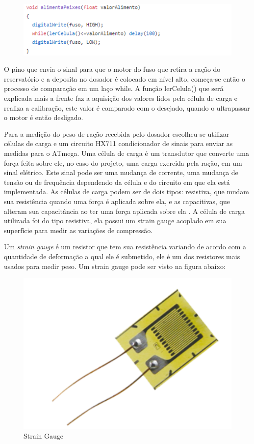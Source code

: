 \begin{figure}[!h]
\centering \includegraphics[scale=0.6]{figuras/controle2_codigo}
\label{codigo_controle2}
 \end{figure}

O pino que envia o sinal para que o motor do fuso que retira a ração do reservatório e a deposita no dosador é colocado em nível alto, começa-se então o processo de comparação  em um laço while. A função lerCelula() que será explicada mais a frente faz a aquisição dos valores lidos pela célula de carga e realiza a calibração, este valor é comparado com o desejado, quando o ultrapassar o motor é então desligado.

Para a medição do peso de ração recebida pelo dosador escolheu-se utilizar células de carga e um circuito HX711 condicionador de sinais para enviar as medidas para o ATmega. Uma célula de carga é um transdutor que converte uma força feita sobre ele, no caso do projeto, uma carga exercida pela ração, em um sinal elétrico. Este sinal pode ser uma mudança de corrente, uma mudança de tensão ou de frequência dependendo da célula e do circuito em que ela está implementada. As células de carga podem ser de dois tipos: resistiva, que mudam sua resistência quando uma força é aplicada sobre ela, e as capacitivas, que alteram sua capacitância ao ter uma força aplicada sobre ela \cite{loadcell}. A célula de carga utilizada foi do tipo resistiva, ela possui um strain gauge acoplado em sua superfície para medir as variações de compressão.

Um \textit{strain gauge} é um resistor que tem sua resistência variando de acordo com a quantidade de deformação a qual ele é submetido, ele é um dos resistores mais usados para medir peso.  Um strain gauge pode ser visto na figura abaixo:


\begin{figure}[!h]
\centering \includegraphics[scale=0.5]{figuras/strain_gage}
\caption{Strain Gauge}
\label{straingauge}
 \end{figure}

